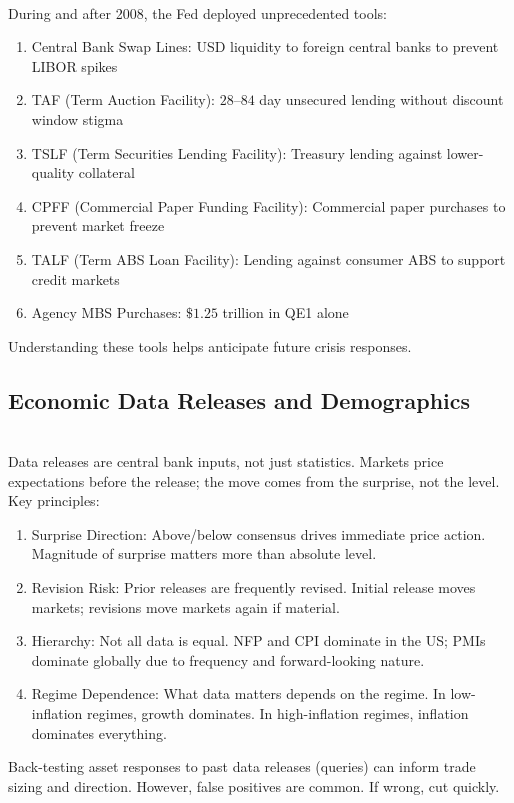 \begin{remark} \\
During and after 2008, the Fed deployed unprecedented tools:
\begin{enumerate}[label=\roman*.]
\setlength{\itemsep}{0pt}
\item Central Bank Swap Lines: USD liquidity to foreign central banks to prevent LIBOR spikes
\item TAF (Term Auction Facility): $28$--$84$ day unsecured lending without discount window stigma
\item TSLF (Term Securities Lending Facility): Treasury lending against lower-quality collateral
\item CPFF (Commercial Paper Funding Facility): Commercial paper purchases to prevent market freeze
\item TALF (Term ABS Loan Facility): Lending against consumer ABS to support credit markets
\item Agency MBS Purchases: $\$1.25$ trillion in QE1 alone
\end{enumerate}
Understanding these tools helps anticipate future crisis responses.
\end{remark}

\subsection{Economic Data Releases and Demographics}

\begin{remark} \\
Data releases are central bank inputs, not just statistics. Markets price expectations before the release; the move comes from the surprise, not the level. Key principles:
\begin{enumerate}[label=\roman*.]
\setlength{\itemsep}{0pt}
\item Surprise Direction: Above/below consensus drives immediate price action. Magnitude of surprise matters more than absolute level.
\item Revision Risk: Prior releases are frequently revised. Initial release moves markets; revisions move markets again if material.
\item Hierarchy: Not all data is equal. NFP and CPI dominate in the US; PMIs dominate globally due to frequency and forward-looking nature.
\item Regime Dependence: What data matters depends on the regime. In low-inflation regimes, growth dominates. In high-inflation regimes, inflation dominates everything.
\end{enumerate}
Back-testing asset responses to past data releases (queries) can inform trade sizing and direction. However, false positives are common. If wrong, cut quickly.
\end{remark}

